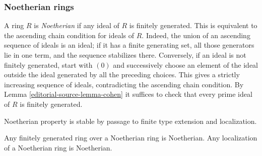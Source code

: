 \subsubsection{Noetherian rings}
\label{editorial-source-section-Noetherian}

\noindent
A ring $R$ is {\it Noetherian} if any ideal of $R$ is finitely generated.
This is equivalent to the ascending chain condition for ideals of $R$.
Indeed, the union of an ascending sequence of ideals is an ideal; if
it has a finite generating set, all those generators lie in one term,
and the sequence stabilizes there. Conversely, if an ideal is not
finitely generated, start with $(0)$ and successively choose an element
of the ideal outside the ideal generated by all the preceding choices.
This gives a strictly increasing sequence of ideals, contradicting
the ascending chain condition.
By
Lemma \ref{editorial-source-lemma-cohen}
it suffices to check that every prime ideal of $R$ is finitely generated.

\begin{lemma}
\label{editorial-source-lemma-Noetherian-permanence}
\begin{slogan}
Noetherian property is stable by passage to finite type extension
and localization.
\end{slogan}
Any finitely generated ring over a Noetherian ring
is Noetherian. Any localization of a Noetherian ring
is Noetherian.
\end{lemma}

